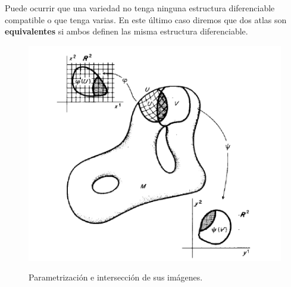 \documentclass[pdftex,11pt,a4paper]{book}
\begin{document}
Puede ocurrir que una variedad no tenga ninguna estructura diferenciable compatible o que tenga varias. En este último caso diremos que dos atlas son  \textbf{equivalentes} si ambos definen las misma estructura diferenciable. 

\begin{figure}[!ht]
\centering
\includegraphics[scale=0.5]{ImagenBonitaVariedad.png}
\label{Fig:Variedad}
\caption{ Parametrización e intersección de sus imágenes.\cite{boothby}}
\end{figure}
\end{document}
